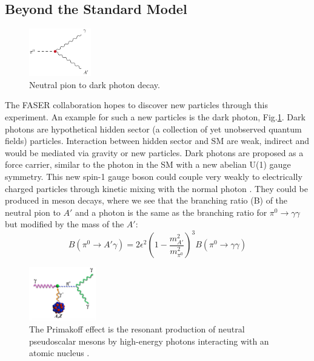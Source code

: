 \subsection{Beyond the Standard Model}

\begin{figure}
  \centering
    \includegraphics[width=0.24\textwidth]{DarkPhoton.png} 
    \caption[Neutral Pion Decay]{Neutral pion to dark photon decay.}
    \label{fig:Dark Photon}
\end{figure}

The FASER collaboration hopes to discover new particles through this experiment. An example for such a new particles is the dark photon, Fig.\ref{fig:Dark Photon}. Dark photons are hypothetical hidden sector (a collection of yet unobserved quantum fields) particles. Interaction between hidden sector and SM are weak, indirect and would be mediated via gravity or new particles. Dark photons are proposed as a force carrier, similar to the photon in the SM with a new abelian U(1) gauge symmetry. This new spin-1 gauge boson could couple very weakly to electrically charged particles through kinetic mixing with the normal photon \cite{noauthor_dark_2019}.
They could be produced in meson decays, where we see that the branching ratio (B) of the neutral pion to $A'$ and a photon is the same as the branching ratio for $\pi^0 \rightarrow \gamma\gamma$ but modified by the mass of  the $A'$:
\[
B(\pi^0 \rightarrow A'\gamma)=2\epsilon^2\left( 1-\frac{m^2_{A'}}{m^2_{\pi^0}} \right)^3B(\pi^0 \rightarrow \gamma\gamma)
\]

\begin{figure}
  \centering
    \includegraphics[width=0.26\textwidth]{Primakoff.png}
    \caption[Primakoff Effect]{The Primakoff effect is the resonant production of neutral pseudoscalar mesons by high-energy photons interacting with an atomic nucleus \cite{kang_standard_1978}.}
    \label{fig:Primakoff}
\end{figure}

